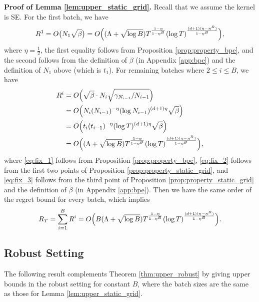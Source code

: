 \documentclass[10pt]{article}
\begin{document}
\textbf{Proof of Lemma \ref{lem:upper_static_grid}.}
Recall that we assume the kernel is SE.
For the first batch, we have
\begin{align}
    R^1 
    = O\bigl(N_1\sqrt{\beta}\bigr) 
    = O\Bigl((\Lambda+\sqrt{\log B})T^{\frac{1-\eta}{1-\eta^B}}(\log T)^{\frac{(d+1)(\eta- \eta^B)}{1-\eta^B}}\Bigr),
\end{align}
where $\eta=\frac{1}{2}$, the first equality follows from Proposition \ref{prop:property_bpe}, 
and the second follows from the definition of $\beta$ (in Appendix \ref{app:bpe}) and the definition of $N_1$ above (which is $t_1$).
For remaining batches where $2\leq i\leq  B$, we have
\begin{align}
    R^i 
    & = O \Bigl(\sqrt{\beta} \cdot N_i\sqrt{\gamma_{N_{i-1}}/N_{i-1}} \Bigr) \label{eq:fix_1} \\
    & = O \Bigl(N_i(N_{i-1})^{-\eta} (\log N_{i-1})^{(d+1)\eta}\sqrt{\beta}\Bigr) \\
    & = O \Bigl(t_i(t_{i-1})^{-\eta} (\log T)^{(d+1)\eta}\sqrt{\beta}\Bigr) \label{eq:fix_2} \\
    & = O\Bigl((\Lambda+\sqrt{\log B})T^{\frac{1-\eta}{1-\eta^B}} (\log T)^{\frac{(d+1)(\eta-\eta^B)}{1-\eta^B}} \Bigr) \label{eq:fix_3},
\end{align}
where \eqref{eq:fix_1} follows from Proposition \ref{prop:property_bpe}, \eqref{eq:fix_2} follows from the first two points of Proposition \ref{prop:property_static_grid}, and \eqref{eq:fix_3} follows from the third point of Proposition \ref{prop:property_static_grid} and the definition of $\beta$ (in Appendix \ref{app:bpe}).
Then we have the same order of the regret bound for every batch, which implies
\begin{align}
    R_T
    = \sum_{i=1}^B R^i
    = O\Bigl( B(\Lambda+\sqrt{\log B}) T^{\frac{1-\eta}{1-\eta^B}} (\log T)^{\frac{(d+1)(\eta-\eta^B)}{1-\eta^B}} \Bigr).
\end{align}

\subsection{Robust Setting}
\label{app:robust_fixed_B_upper_bounds}

The following result complements Theorem \ref{thm:upper_robust} by giving upper bounds in the robust setting for constant $B$, where the batch sizes are the same as those for Lemma \ref{lem:upper_static_grid}.
\end{document}
